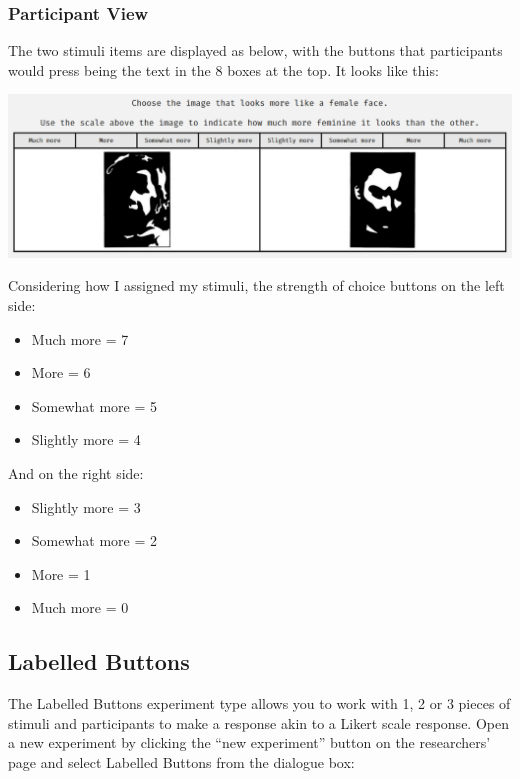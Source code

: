 \documentclass[]{book}
\providecommand{\tightlist}{%
  \setlength{\itemsep}{0pt}\setlength{\parskip}{0pt}}
\begin{document}
\subsubsection*{Participant View}\label{participant-view-1}

The two stimuli items are displayed as below, with the buttons that
participants would press being the text in the 8 boxes at the top. It
looks like this:

\includegraphics{images/screenshots/view_jnd.png}

Considering how I assigned my stimuli, the strength of choice buttons on
the left side:

\begin{itemize}
\tightlist
\item
  Much more = 7
\item
  More = 6
\item
  Somewhat more = 5
\item
  Slightly more = 4
\end{itemize}

And on the right side:

\begin{itemize}
\tightlist
\item
  Slightly more = 3
\item
  Somewhat more = 2
\item
  More = 1
\item
  Much more = 0
\end{itemize}

\subsection{Labelled Buttons}\label{labelled-buttons}

The Labelled Buttons experiment type allows you to work with 1, 2 or 3
pieces of stimuli and participants to make a response akin to a Likert
scale response. Open a new experiment by clicking the ``new experiment''
button on the researchers' page and select Labelled Buttons from the
dialogue box:
\end{document}
